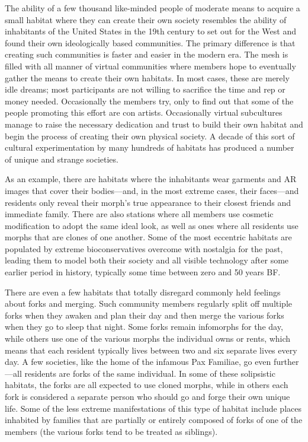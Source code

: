 The ability of a few thousand like-minded people of moderate means to acquire a small habitat where they can create their own society resembles the ability of inhabitants of the United States in the 19th century to set out for the West and found their own ideologically based communities. The primary difference is that creating such communities is faster and easier in the modern era. The mesh is filled with all manner of virtual communities where members hope to eventually gather the means to create their own habitats. In most cases, these are merely idle dreams; most participants are not willing to sacrifice the time and rep or money needed. Occasionally the members try, only to find out that some of the people promoting this effort are con artists. Occasionally virtual subcultures manage to raise the necessary dedication and trust to build their own habitat and begin the process of creating their own physical society. A decade of this sort of cultural experimentation by many hundreds of habitats has produced a number of unique and strange societies. 

As an example, there are habitats where the inhabitants wear garments and AR images that cover their bodies—and, in the most extreme cases, their faces—and residents only reveal their morph's true appearance to their closest friends and immediate family. There are also stations where all members use cosmetic modification to adopt the same ideal look, as well as ones where all residents use morphs that are clones of one another. Some of the most eccentric habitats are populated by extreme bioconservatives overcome with nostalgia for the past, leading them to model both their society and all visible technology after some earlier period in history, typically some time between zero and 50 years BF. 

There are even a few habitats that totally disregard commonly held feelings about forks and merging. Such community members regularly split off multiple forks when they awaken and plan their day and then merge the various forks when they go to sleep that night. Some forks remain infomorphs for the day, while others use one of the various morphs the individual owns or rents, which means that each resident typically lives between two and six separate lives every day. A few societies, like the home of the infamous Pax Familiae, go even further—all residents are forks of the same individual. In some of these solipsistic habitats, the forks are all expected to use cloned morphs, while in others each fork is considered a separate person who should go and forge their own unique life. Some of the less extreme manifestations of this type of habitat include places inhabited by families that are partially or entirely composed of forks of one of the members (the various forks tend to be treated as siblings). 

